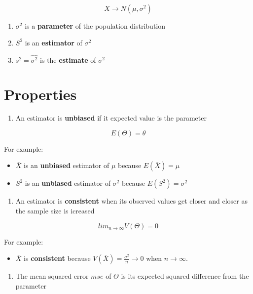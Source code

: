 \documentclass[
]{book}
\providecommand{\tightlist}{%
  \setlength{\itemsep}{0pt}\setlength{\parskip}{0pt}}
\begin{document}
\[X \rightarrow N(\mu, \sigma^2)\]

\begin{enumerate}
\def\labelenumi{\arabic{enumi}.}
\tightlist
\item
  \(\sigma^2\) is a \textbf{parameter} of the population distribution
\item
  \(S^2\) is an \textbf{estimator} of \(\sigma^2\)
\item
  \(s^2=\hat{\sigma^2}\) is the \textbf{estimate} of \(\sigma^2\)
\end{enumerate}

\hypertarget{properties}{%
\section{Properties}\label{properties}}

\begin{enumerate}
\def\labelenumi{\arabic{enumi}.}
\tightlist
\item
  An estimator is \textbf{unbiased} if it expected value is the parameter
\end{enumerate}

\[E(\Theta)=\theta\]

For example:

\begin{itemize}
\item
  \(\bar{X}\) is an \textbf{unbiased} estimator of \(\mu\) because \(E(\bar{X})=\mu\)
\item
  \(S^2\) is an \textbf{unbiased} estimator of \(\sigma^2\) because \(E(S^2)=\sigma^2\)
\end{itemize}

\begin{enumerate}
\def\labelenumi{\arabic{enumi}.}
\setcounter{enumi}{1}
\tightlist
\item
  An estimator is \textbf{consistent} when its observed values get closer and closer as the sample size is icreased
\end{enumerate}

\[lim_{n\rightarrow \infty} V(\Theta) = 0\]

For example:

\begin{itemize}
\tightlist
\item
  \(\bar{X}\) is \textbf{consistent} because \(V(\bar{X})=\frac{\sigma^2}{n}\rightarrow 0\) when \(n \rightarrow \infty\).
\end{itemize}

\begin{enumerate}
\def\labelenumi{\arabic{enumi}.}
\setcounter{enumi}{2}
\tightlist
\item
  The mean squared error \(mse\) of \(\Theta\) is its expected squared difference from the parameter
\end{enumerate}
\end{document}
